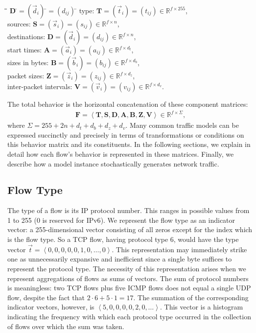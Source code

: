 \documentclass[twocolumn,final]{svjour3}
\newcommand{\caps}[1]{{\small{#1}}}
\newcommand{\R}{\mathbb{R}}
\newcommand{\mat}[1]{\mathbf{#1}}
\newcommand{\parensx}[1]{(#1)}
\newcommand{\seq}[1]{\left<#1\right>}
\renewcommand{\bullet}{\raisebox{2pt}{$\centerdot$}}
\begin{document}
\begin{tabbing}
\hspace{1em}\=\bullet\hspace{0.5em}\=\hspace{9.75em}\=
$\mat{D}\:$\=$=\parensx{\vec{d}_i}\:$\=$=\parensx{d_{ij}}\:$\=\kill
\>\bullet\> type: \>$\mat{T}$\>$=\parensx{\vec{t}_i}$\>$=\parensx{t_{ij}}$\>$\in\R^{f \times 255}$,\\
\>\bullet\> sources: \>$\mat{S}$\>$=\parensx{\vec{s}_i}$\>$=\parensx{s_{ij}}$\>$\in\R^{f \times n}$,\\
\>\bullet\> destinations: \>$\mat{D}$\>$=\parensx{\vec{d}_i}$\>$=\parensx{d_{ij}}$\>$\in\R^{f \times n}$,\\
\>\bullet\> start times: \>$\mat{A}$\>$=\parensx{\vec{a}_i}$\>$=\parensx{a_{ij}}$\>$\in\R^{f \times d_t}$,\\
\>\bullet\> sizes in bytes: \>$\mat{B}$\>$=\parensx{\vec{b}_i}$\>$=\parensx{b_{ij}}$\>$\in\R^{f \times d_b}$,\\
\>\bullet\> packet sizes: \>$\mat{Z}$\>$=\parensx{\vec{z}_i}$\>$=\parensx{z_{ij}}$\>$\in\R^{f \times d_z}$,\\
\>\bullet\> inter-packet intervals: \>$\mat{V}$\>$=\parensx{\vec{v}_i}$\>$=\parensx{v_{ij}}$\>$\in\R^{f \times d_v}$.
\end{tabbing}
The total behavior is the horizontal concatenation of these component matrices:
\begin{align}
\mat{F} = \seq{\mat{T},\mat{S},\mat{D},\mat{A},\mat{B},\mat{Z},\mat{V}} \in \R^{f \times \Sigma},
\end{align}
where $\Sigma=255+2n+d_t+d_b+d_z+d_v$. Many common traffic models can be expressed succinctly and precisely in terms of transformations or conditions on this behavior matrix and its constituents. In the following sections, we explain in detail how each flow's behavior is represented in these matrices. Finally, we describe how a model instance stochastically generates network traffic.

\subsection{Flow Type}

The type of a flow is its \caps{IP} protocol number. This ranges in possible values from 1 to 255 (0 is reserved for \caps{IPv6}). We represent the flow type as an indicator vector: a 255-dimensional vector consisting of all zeros except for the index which is the flow type. So a \caps{TCP} flow, having protocol type 6, would have the type vector $\vec{t}=\seq{0,0,0,0,0,1,0,\dots,0}$. This representation may immediately strike one as unnecessarily expansive and inefficient since a single byte suffices to represent the protocol type. The necessity of this representation arises when we represent aggregations of flows as sums of vectors. The sum of protocol numbers is meaningless: two \caps{TCP} flows plus five \caps{ICMP} flows does not equal a single \caps{UDP} flow, despite the fact that $2\cdot6+5\cdot1=17$. The summation of the corresponding indicator vectors, however, is $\seq{5,0,0,0,0,2,0,\dots}$. This vector is a histogram indicating the frequency with which each protocol type occurred in the collection of flows over which the sum was taken.
\end{document}
